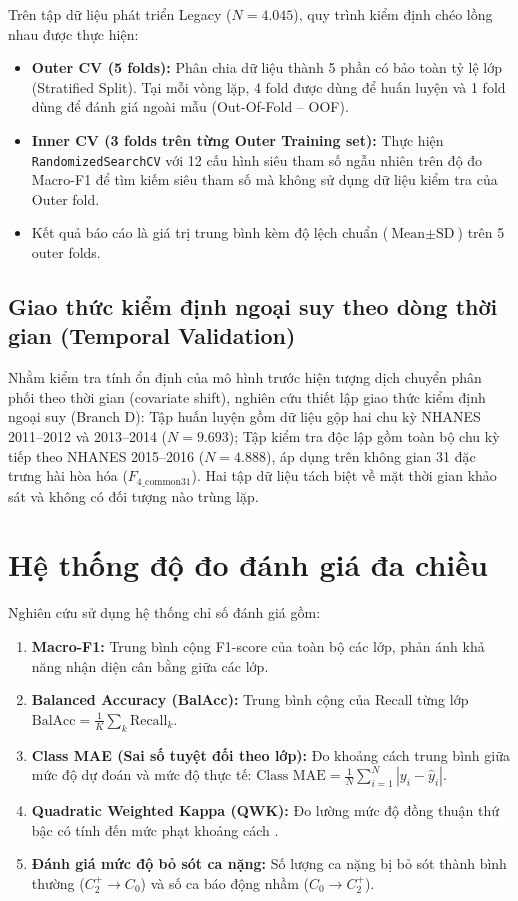 Trên tập dữ liệu phát triển Legacy ($N = 4.045$), quy trình kiểm định chéo lồng nhau được thực hiện:
\begin{itemize}
    \item \textbf{Outer CV (5 folds):} Phân chia dữ liệu thành 5 phần có bảo toàn tỷ lệ lớp (Stratified Split). Tại mỗi vòng lặp, 4 fold được dùng để huấn luyện và 1 fold dùng để đánh giá ngoài mẫu (Out-Of-Fold -- OOF).
    \item \textbf{Inner CV (3 folds trên từng Outer Training set):} Thực hiện \texttt{RandomizedSearchCV} với 12 cấu hình siêu tham số ngẫu nhiên trên độ đo Macro-F1 để tìm kiếm siêu tham số mà không sử dụng dữ liệu kiểm tra của Outer fold.
    \item Kết quả báo cáo là giá trị trung bình kèm độ lệch chuẩn ($\text{Mean} \pm \text{SD}$) trên 5 outer folds.
\end{itemize}

\subsection{Giao thức kiểm định ngoại suy theo dòng thời gian (Temporal Validation)}
\label{subsec:temporal-protocol}

Nhằm kiểm tra tính ổn định của mô hình trước hiện tượng dịch chuyển phân phối theo thời gian (covariate shift), nghiên cứu thiết lập giao thức kiểm định ngoại suy (Branch D): Tập huấn luyện gồm dữ liệu gộp hai chu kỳ NHANES 2011--2012 và 2013--2014 ($N = 9.693$); Tập kiểm tra độc lập gồm toàn bộ chu kỳ tiếp theo NHANES 2015--2016 ($N = 4.888$), áp dụng trên không gian 31 đặc trưng hài hòa hóa ($F_{4\_\text{common31}}$). Hai tập dữ liệu tách biệt về mặt thời gian khảo sát và không có đối tượng nào trùng lặp.

\section{Hệ thống độ đo đánh giá đa chiều}
\label{sec:he-thong-do-do}

Nghiên cứu sử dụng hệ thống chỉ số đánh giá gồm:
\begin{enumerate}
    \item \textbf{Macro-F1:} Trung bình cộng F1-score của toàn bộ các lớp, phản ánh khả năng nhận diện cân bằng giữa các lớp.
    \item \textbf{Balanced Accuracy (BalAcc):} Trung bình cộng của Recall từng lớp $\text{BalAcc} = \frac{1}{K}\sum_k \text{Recall}_k$.
    \item \textbf{Class MAE (Sai số tuyệt đối theo lớp):} Đo khoảng cách trung bình giữa mức độ dự đoán và mức độ thực tế: $\text{Class MAE} = \frac{1}{N} \sum_{i=1}^N |y_i - \hat{y}_i|$.
    \item \textbf{Quadratic Weighted Kappa (QWK):} Đo lường mức độ đồng thuận thứ bậc có tính đến mức phạt khoảng cách \cite{cohen1968weighted}.
    \item \textbf{Đánh giá mức độ bỏ sót ca nặng:} Số lượng ca nặng bị bỏ sót thành bình thường ($C_2^+ \to C_0$) và số ca báo động nhầm ($C_0 \to C_2^+$).
\end{enumerate}

